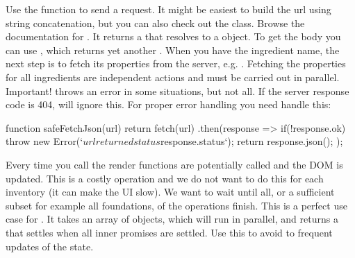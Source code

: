 \documentclass[fleqn, article, a4paper]{memoir}
\begin{document}
\begin{Assignments}
Use the  function to send a request. It might be easiest to build the url using string concatenation, but you can also check out the  class. Browse the documentation for . It returns a  that resolves to a  object. To get the body you can use , which returns yet another . When you have the ingredient name, the next step is to fetch its properties from the server, e.g. . Fetching the properties for all ingredients are independent actions and must be carried out in parallel. Important!  throws an error in some situations, but not all. If the server response code is 404,  will ignore this. For proper error handling you need handle this:
\begin{Code}
function safeFetchJson(url) {
  return fetch(url)
  .then(response => {
    if(!response.ok) {
      throw new Error(`${url} returned status ${response.status}`);
    }
    return response.json();
  });
}
\end{Code}
Every time you call  the render functions are potentially called and the DOM is updated. This is a costly operation and we do not want to do this for each inventory (it can make the UI slow). We want to wait until all, or a sufficient subset for example all foundations, of the  operations finish. This is a perfect use case for . It takes an array of  objects, which will run in parallel, and returns a  that settles when all inner promises are settled. Use this to avoid to frequent updates of the state.


\end{Assignments}
\end{document}
